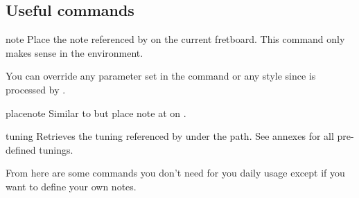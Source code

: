 \documentclass[a4paper]{article}
\begin{document}
\subsection{Useful commands}

\begin{docCommand}{note}{}
  Place the note referenced by  on the current fretboard. This
  command only makes sense in the  environment.

  You can override any parameter set in the  command or
  any  style since  is processed by
  .
\end{docCommand}

\begin{docCommand}{placenote}{}
  Similar to  but place note  at 
  on .
\end{docCommand}


\begin{docCommand}{tuning}{}
  Retrieves the tuning referenced by  under the
   path. See annexes for all pre-defined tunings.
\end{docCommand}

From here are some commands you don't need for you daily usage except if you
want to define your own notes.
\end{document}
